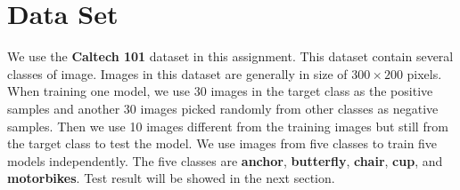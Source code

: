 \section{Data Set}

We use the \textbf{Caltech 101} dataset in this assignment. This dataset contain several classes of image. 
Images in this dataset are generally in size of $300 \times 200$ pixels. 
When training one model, 
we use 30 images in the target class as the positive samples and another 30 images picked randomly from other classes as negative samples.
Then we use 10 images different from the training images but still from the target class to test the model.
We use images from five classes to train five models independently.
The five classes are \textbf{anchor}, \textbf{butterfly}, \textbf{chair}, \textbf{cup}, and \textbf{motorbikes}.
Test result will be showed in the next section.

